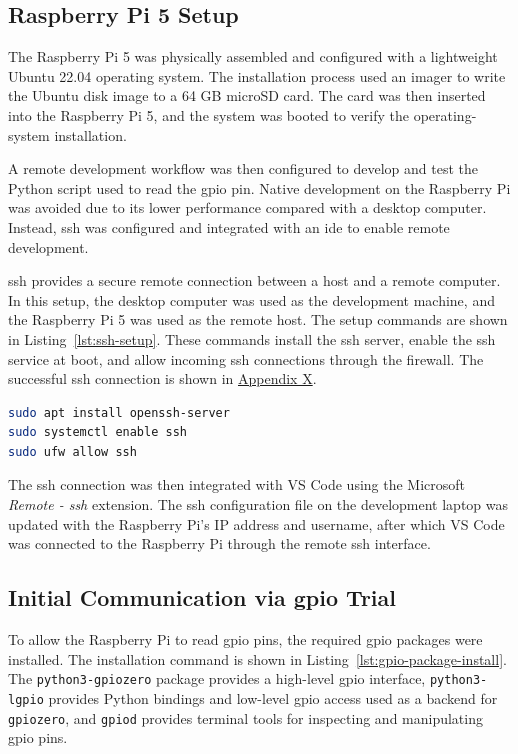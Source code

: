 \subsection{Raspberry Pi 5 Setup}

The Raspberry Pi 5 was physically assembled and configured with a lightweight Ubuntu 22.04 operating system. The installation process used an imager to write the Ubuntu disk image to a 64 GB microSD card. The card was then inserted into the Raspberry Pi 5, and the system was booted to verify the operating-system installation.

A remote development workflow was then configured to develop and test the Python script used to read the \gls{gpio} pin. Native development on the Raspberry Pi was avoided due to its lower performance compared with a desktop computer. Instead, \gls{ssh} was configured and integrated with an \gls{ide} to enable remote development.

\gls{ssh} provides a secure remote connection between a host and a remote computer. In this setup, the desktop computer was used as the development machine, and the Raspberry Pi 5 was used as the remote host. The setup commands are shown in Listing~\ref{lst:ssh-setup}. These commands install the \gls{ssh} server, enable the \gls{ssh} service at boot, and allow incoming \gls{ssh} connections through the firewall. The successful \gls{ssh} connection is shown in \hyperlink{appendix:ssh-connection}{Appendix X}.

\begin{lstlisting}[language=bash,caption={The commands used to setup SSH connection between the Raspberry Pi and a remote computer.},label={lst:ssh-setup}]
sudo apt install openssh-server
sudo systemctl enable ssh
sudo ufw allow ssh
\end{lstlisting}

The \gls{ssh} connection was then integrated with VS Code using the Microsoft \textit{Remote - \gls{ssh}} extension. The \gls{ssh} configuration file on the development laptop was updated with the Raspberry Pi's IP address and username, after which VS Code was connected to the Raspberry Pi through the remote \gls{ssh} interface.

\subsection[Initial Communication via GPIO Trial]{Initial Communication via \gls{gpio} Trial}

To allow the Raspberry Pi to read \gls{gpio} pins, the required \gls{gpio} packages were installed. The installation command is shown in Listing~\ref{lst:gpio-package-install}. The \texttt{python3-gpiozero} package provides a high-level \gls{gpio} interface, \texttt{python3-lgpio} provides Python bindings and low-level \gls{gpio} access used as a backend for \texttt{gpiozero}, and \texttt{gpiod} provides terminal tools for inspecting and manipulating \gls{gpio} pins.

